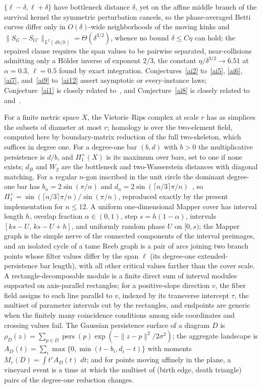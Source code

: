 \documentclass[11pt]{article}
\theoremstyle{definition}
\newcommand{\dd}{\,d}
\begin{document}
$\{\ell-\delta,\ell+\delta\}$ have bottleneck distance $\delta$, yet on the affine middle branch of the survival kernel the symmetric perturbation cancels, so the phase-averaged Betti curves differ only in $O(\delta)$-wide neighborhoods of the moving kinks and $\lVert S_G-S_{G'}\rVert_{L^2(\dd h/h)}=\Theta(\delta^{3/2})$, whence no bound $\delta\le C\eta$ can hold; the repaired clause requires the span values to be pairwise separated, near-collisions admitting only a H\"older inverse of exponent $2/3$, the constant $\eta/\delta^{3/2}\to6.51$ at $\alpha=0.3$, $\ell=0.5$ found by exact integration.  Conjectures~\ref{ai2} to~\ref{ai5}, \ref{ai6}, \ref{ai7}, and~\ref{ai9} to~\ref{ai12} assert asymptotic or every-instance laws; Conjecture~\ref{ai1} is closely related to~\cite{GoM24}, and Conjecture~\ref{ai8} is closely related to~\cite{Vip20} and~\cite{CDFFL13}.

For a finite metric space $X$, the Vietoris--Rips complex at scale $r$ has as simplices the subsets of diameter at most $r$; homology is over the two-element field, computed here by boundary-matrix reduction of the full two-skeleton, which suffices in degree one.  For a degree-one bar $(b,d)$ with $b>0$ the multiplicative persistence is $d/b$, and $\Pi_1^\times(X)$ is its maximum over bars, set to one if none exists; $d_B$ and $W_2$ are the bottleneck and two-Wasserstein distances with diagonal matching.  For a regular $n$-gon inscribed in the unit circle the dominant degree-one bar has $b_n=2\sin(\pi/n)$ and $d_n=2\sin(\lceil n/3\rceil\pi/n)$~\cite{ACJS18,AdAd17}, so $\Pi_1^\times=\sin(\lceil n/3\rceil\pi/n)/\sin(\pi/n)$, reproduced exactly by the present implementation for $n\le12$.  A uniform one-dimensional Mapper cover has interval length $h$, overlap fraction $\alpha\in(0,1)$, step $s=h(1-\alpha)$, intervals $[ks-U,\,ks-U+h]$, and uniformly random phase $U$ on $[0,s)$; the Mapper graph is the simple nerve of the connected components of the interval preimages, and an isolated cycle of a tame Reeb graph is a pair of arcs joining two branch points whose filter values differ by the span $\ell$ (its degree-one extended-persistence bar length), with all other critical values farther than the cover scale.  A rectangle-decomposable module is a finite direct sum of interval modules supported on axis-parallel rectangles; for a positive-slope direction $v$, the fiber field assigns to each line parallel to $v$, indexed by its transverse intercept $\tau$, the multiset of parameter intervals cut by the rectangles, and endpoints are generic when the finitely many coincidence conditions among side coordinates and crossing values fail.  The Gaussian persistence surface of a diagram $D$ is $\rho_D(z)=\sum_{p\in D}\operatorname{pers}(p)\exp(-\lVert z-p\rVert^2/2\sigma^2)$; the aggregate landscape is $A_D(t)=\sum_i\max\{0,\min(t-b_i,d_i-t)\}$ with moments $M_r(D)=\int t^rA_D(t)\,\dd t$; and for points moving affinely in the plane, a vineyard event is a time at which the multiset of (birth edge, death triangle) pairs of the degree-one reduction changes.
\end{document}
